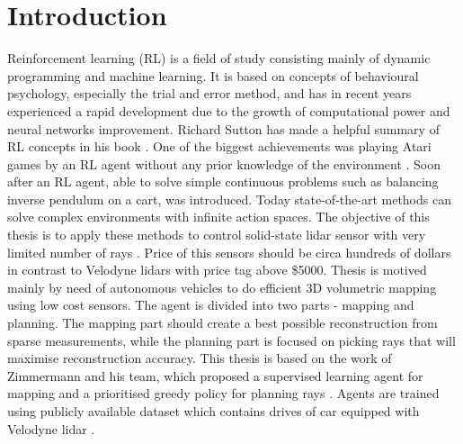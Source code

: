 \section{Introduction}

Reinforcement learning (RL) is a field of study consisting mainly of dynamic programming and machine learning. It is based on concepts of behavioural psychology, especially the trial and error method, and has in recent years experienced a rapid development due to the growth of computational power and neural networks improvement. Richard Sutton has made a helpful summary of RL concepts in his book \cite{sutton2012}. One of the biggest achievements was playing Atari games by an RL agent without any prior knowledge of the environment \cite{mnih2015}. Soon after an RL agent, able to solve simple continuous problems such as balancing inverse pendulum on a cart, was introduced. Today state-of-the-art methods can solve complex environments with infinite action spaces. The objective of this thesis is to apply these methods to control solid-state lidar sensor with very limited number of rays \cite{quanergy2016}. Price of this sensors should be circa hundreds of dollars in contrast to Velodyne lidars with price tag above \$5000. Thesis is motived mainly by need of autonomous vehicles to do efficient 3D volumetric mapping using low cost sensors. The agent is divided into two parts - mapping and planning. The mapping part should create a best possible reconstruction from sparse measurements, while the planning part is focused on picking rays that will maximise reconstruction accuracy. This thesis is based on the work of Zimmermann and his team, which proposed a supervised learning agent for mapping and a prioritised greedy policy for planning rays \cite{zimmermann2017}. Agents are trained using publicly available dataset which contains drives of car equipped with Velodyne lidar \cite{geiger2013}. 